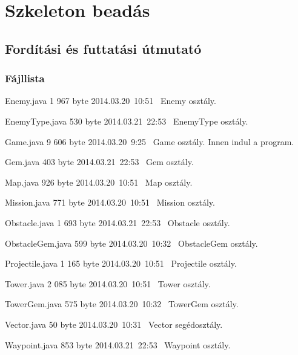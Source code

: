 %
\chapter{Szkeleton beadás}

\thispagestyle{fancy}

\section{Fordítási és futtatási útmutató}

\subsection{Fájllista}

\begin{fajllista}

\fajl
{Enemy.java} %
{1 967 byte} %
{2014.03.20~10:51~}
{Enemy osztály.} %

\fajl
{EnemyType.java} %
{530 byte} %
{2014.03.21~22:53~}
{EnemyType osztály.} %

\fajl
{Game.java} %
{9 606 byte} %
{2014.03.20~9:25~}
{Game osztály. Innen indul a program.} %

\fajl
{Gem.java} %
{403 byte} %
{2014.03.21~22:53~}
{Gem osztály.} %

\fajl
{Map.java} %
{926 byte} %
{2014.03.20~10:51~}
{Map osztály.} %

\fajl
{Mission.java} %
{771 byte} %
{2014.03.20~10:51~}
{Mission osztály.} %

\fajl
{Obstacle.java} %
{1 693 byte} %
{2014.03.21~22:53~}
{Obstacle osztály.} %

\fajl
{ObstacleGem.java} %
{599 byte} %
{2014.03.20~10:32~}
{ObstacleGem osztály.} %

\fajl
{Projectile.java} %
{1 165 byte} %
{2014.03.20~10:51~}
{Projectile osztály.} %

\fajl
{Tower.java} %
{2 085 byte} %
{2014.03.20~10:51~}
{Tower osztály.} %

\fajl
{TowerGem.java} %
{575 byte} %
{2014.03.20~10:32~}
{TowerGem osztály.} %

\fajl
{Vector.java} %
{50 byte} %
{2014.03.20~10:31~}
{Vector segédosztály.} %

\fajl
{Waypoint.java} %
{853 byte} %
{2014.03.21~22:53~}
{Waypoint osztály.} %

\end{fajllista}

